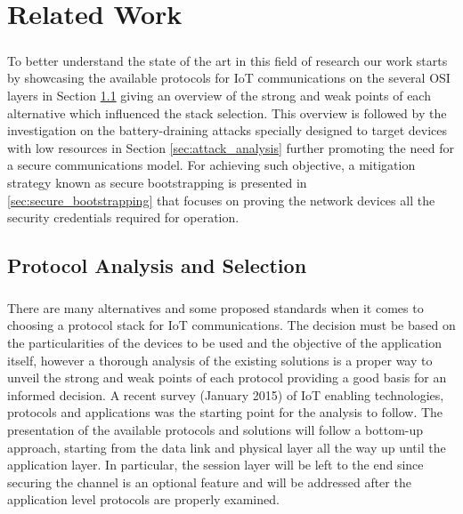 
\chapter{Related Work}
\label{chapter:related_work}

\paragraph{}
To better understand the state of the art in this field of research our work starts by showcasing the available protocols for \gls{IoT} communications on the several OSI layers in Section \ref{sec:protocol_analysis} giving an overview of the strong and weak points of each alternative which influenced the stack selection. This overview is followed by the investigation on the battery-draining attacks specially designed to target devices with low resources in Section \ref{sec:attack_analysis} further promoting the need for a secure communications model. For achieving such objective, a mitigation strategy known as secure bootstrapping is presented in \ref{sec:secure_bootstrapping} that focuses on proving the network devices all the security credentials required for operation.

\section{Protocol Analysis and Selection}
\label{sec:protocol_analysis}

\paragraph{}
There are many alternatives and some proposed standards when it comes to choosing a protocol stack for \gls{IoT} communications. The decision must be based on the particularities of the devices to be used and the objective of the application itself, however a thorough analysis of the existing solutions is a proper way to unveil the strong and weak points of each protocol providing a good basis for an informed decision. A recent survey (January 2015) \cite{Al-Fuqaha2015} of \gls{IoT} enabling technologies, protocols and applications was the starting point for the analysis to follow. The presentation of the available protocols and solutions will follow a bottom-up approach, starting from the data link and physical layer all the way up until the application layer. In particular, the session layer will be left to the end since securing the channel is an optional feature and will be addressed after the application level protocols are properly examined.

